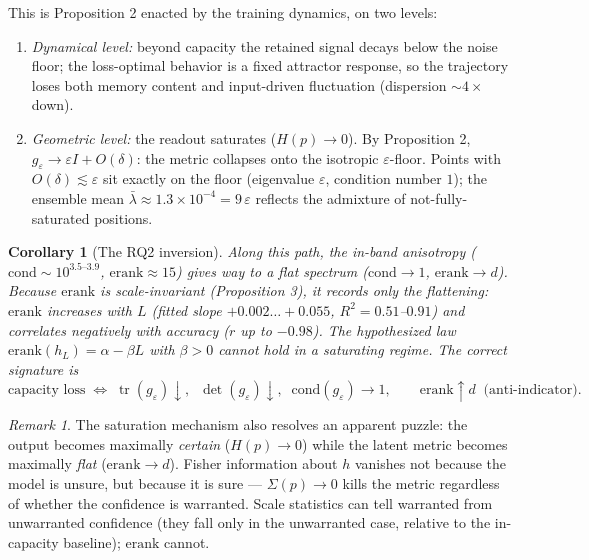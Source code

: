 \documentclass[11pt,a4paper]{article}
\newtheorem{cor}{Corollary}
\theoremstyle{definition}
\theoremstyle{remark}
\newtheorem{rem}{Remark}
\begin{document}
This is Proposition 2 enacted by the training dynamics, on two levels:
\begin{enumerate}
\item \emph{Dynamical level:} beyond capacity the retained signal decays below the noise floor;
the loss-optimal behavior is a fixed attractor response, so the trajectory loses both memory
content and input-driven fluctuation (dispersion ${\sim}4\times$ down).
\item \emph{Geometric level:} the readout saturates ($H(p) \to 0$). By Proposition 2,
$g_\varepsilon \to \varepsilon I + O(\delta)$: the metric collapses onto the isotropic
$\varepsilon$-floor. Points with $O(\delta) \lesssim \varepsilon$ sit exactly on the floor
(eigenvalue $\varepsilon$, condition number $1$); the ensemble mean $\bar\lambda \approx
1.3\times10^{-4} = 9\,\varepsilon$ reflects the admixture of not-fully-saturated positions.
\end{enumerate}

\begin{cor}[The RQ2 inversion]
Along this path, the in-band anisotropy ($\mathrm{cond} \sim 10^{3.5\text{--}3.9}$,
$\mathrm{erank} \approx 15$) gives way to a flat spectrum ($\mathrm{cond} \to 1$,
$\mathrm{erank} \to d$). Because $\mathrm{erank}$ is scale-invariant (Proposition 3), it records
\emph{only} the flattening: $\mathrm{erank}$ \emph{increases} with $L$ (fitted slope
$+0.002\ldots+0.055$, $R^2 = 0.51$--$0.91$) and correlates \emph{negatively} with accuracy
($r$ up to $-0.98$). The hypothesized law $\mathrm{erank}(h_L) = \alpha - \beta L$ with
$\beta > 0$ cannot hold in a saturating regime. The correct signature is
\[
\text{capacity loss}
\;\Longleftrightarrow\;
\operatorname{tr}(g_\varepsilon)\!\downarrow,\;\;
\det(g_\varepsilon)\!\downarrow,\;\;
\mathrm{cond}(g_\varepsilon) \to 1,
\qquad
\mathrm{erank} \uparrow d \;\;\text{(anti-indicator)}.
\]
\end{cor}

\begin{rem}
The saturation mechanism also resolves an apparent puzzle: the output becomes maximally
\emph{certain} ($H(p) \to 0$) while the latent metric becomes maximally \emph{flat}
($\mathrm{erank} \to d$). Fisher information about $h$ vanishes not because the model is unsure,
but because it is sure --- $\Sigma(p) \to 0$ kills the metric regardless of whether the confidence
is warranted. Scale statistics can tell warranted from unwarranted confidence (they fall only in
the unwarranted case, relative to the in-capacity baseline); $\mathrm{erank}$ cannot.
\end{rem}
\end{document}
